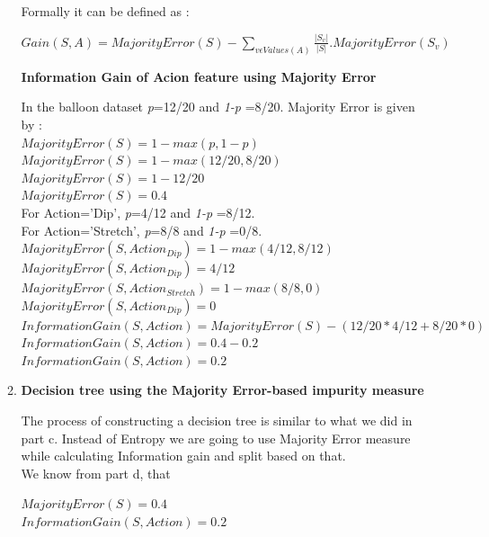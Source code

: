 \documentclass[11pt]{article}
\begin{document}
\begin{enumerate}
\begin{enumerate}
			Formally it can be defined as :
			\begin{center}
				$\boxed{Gain(S,A)= MajorityError(S)- \sum_{v \epsilon Values(A)}^{} \frac{|S_v|}{|S|}. MajorityError(S_v)}$
			\end{center}	
			
			\textbf{ Information Gain of Acion feature using Majority Error}
			
			In the balloon dataset \emph{p}=12/20  and \emph{1-p} =8/20. Majority Error is given by :\\
			
			$MajorityError(S)=1 -max(p,1-p)$\\
			$MajorityError(S)=1 -max(12/20,8/20)$\\
			$MajorityError(S)=1 -12/20$\\
			$\boxed{MajorityError(S)=0.4}$\\
			
			For Action='Dip', 	\emph{p}=4/12  and \emph{1-p} =8/12. \\ 
			For Action='Stretch', 	\emph{p}=8/8 and \emph{1-p} =0/8.  \\	 	 
			
			$MajorityError(S,Action_{Dip})=1-max(4/12,8/12)$\\
			$MajorityError(S,Action_{Dip})=4/12$\\
			
			$MajorityError(S,Action_{Stretch})=1-max(8/8,0)$\\
			$MajorityError(S,Action_{Dip})=0$\\
			
			$Information Gain(S, Action)= MajorityError(S) - (12/20 *4/12  + 8/20 *0)$\\
			$Information Gain(S, Action)= 0.4 -  0.2$\\
			$\boxed{Information Gain(S, Action)=0.2}$\\
			
			
			\item {\textbf{Decision tree using the Majority Error-based impurity measure}}
			
			The process of constructing a decision tree is similar to what we did in part c. Instead of Entropy we are going to use Majority Error measure while calculating Information gain and split based on that.\\
			We know from part d, that 
			
			$MajorityError(S)=0.4$\\
			$Information Gain(S, Action)=0.2$\\
			

\end{enumerate}
\end{enumerate}
\end{document}
